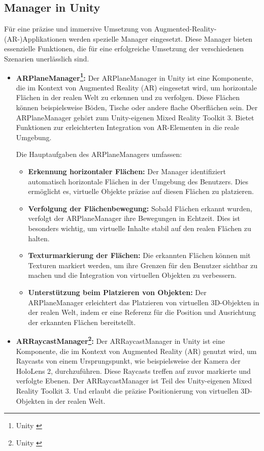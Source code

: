 \subsection{Manager in Unity}
Für eine präzise und immersive Umsetzung von Augmented-Reality-(AR-)Applikationen werden spezielle Manager eingesetzt.
Diese Manager bieten essenzielle Funktionen, die für eine erfolgreiche Umsetzung der verschiedenen Szenarien unerlässlich
sind.
\begin{itemize}
    \item \textbf{ARPlaneManager\footnote{Unity \cite{Managers}}:}
    Der ARPlaneManager in Unity ist eine Komponente, die im Kontext von Augmented Reality (AR) eingesetzt wird, um
    horizontale Flächen in der realen Welt zu erkennen und zu verfolgen. Diese Flächen können beispielsweise Böden,
    Tische oder andere flache Oberflächen sein. Der ARPlaneManager gehört zum Unity-eigenen Mixed Reality Toolkit 3.
    Bietet Funktionen zur erleichterten Integration von AR-Elementen in die reale Umgebung.

    Die Hauptaufgaben des ARPlaneManagers umfassen:
    \begin{itemize}
        \item \textbf{Erkennung horizontaler Flächen:} Der Manager identifiziert automatisch horizontale Flächen in der
        Umgebung des Benutzers. Dies ermöglicht es, virtuelle Objekte präzise auf diesen Flächen zu platzieren.
        \item \textbf{Verfolgung der Flächenbewegung:} Sobald Flächen erkannt wurden, verfolgt der ARPlaneManager ihre
        Bewegungen in Echtzeit. Dies ist besonders wichtig, um virtuelle Inhalte stabil auf den realen Flächen zu halten.
        \item \textbf{Texturmarkierung der Flächen:} Die erkannten Flächen können mit Texturen markiert werden, um ihre
        Grenzen für den Benutzer sichtbar zu machen und die Integration von virtuellen Objekten zu verbessern.
        \item \textbf{Unterstützung beim Platzieren von Objekten:} Der ARPlaneManager erleichtert das Platzieren von
        virtuellen 3D-Objekten in der realen Welt, indem er eine Referenz für die Position und Ausrichtung der erkannten
        Flächen bereitstellt.
    \end{itemize}

    \item \textbf{ARRaycastManager\footnote{Unity \cite{RaycastManager}}:}
    Der ARRaycastManager in Unity ist eine Komponente, die im Kontext von Augmented Reality (AR) genutzt wird, um Raycasts von
    einem Ursprungspunkt, wie beispielsweise der Kamera der HoloLens 2, durchzuführen. Diese Raycasts treffen
    auf zuvor markierte und verfolgte Ebenen. Der ARRaycastManager ist Teil des Unity-eigenen Mixed Reality Toolkit 3.
    Und erlaubt die präzise Positionierung von virtuellen 3D-Objekten in der realen Welt.


\end{itemize}
